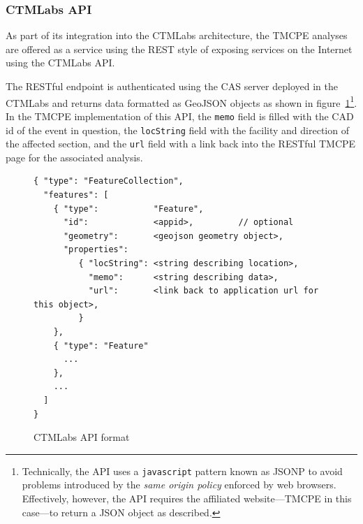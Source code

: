 \documentclass[12pt]{report}
\newcounter{space}
\begin{document}


\subsubsection{CTMLabs API}
\label{sec:ctmlabs-api}

As part of its integration into the \ac{CTMLabs} architecture, the
\ac{TMCPE} analyses are offered as a service using the \ac{REST} style
of exposing services on the Internet
\citep{fielding00:_archit_styles_desig_networ_softw_archit} using the
CTMLabs \ac{API}.

The RESTful endpoint is authenticated using the \ac{CAS} server
deployed in the \ac{CTMLabs} and returns data formatted as
\ac{GeoJSON} objects \citep{butler08:_geojs_format_specif} as shown in
figure~\ref{fig:ctmlabs-api}\footnote{Technically, the \ac{API} uses a
  \texttt{javascript} pattern known as \ac{JSONP}
  \citep{özses09:_cross_jsonp_part} to avoid problems introduced by
  the \emph{same origin policy} enforced by web browsers.
  Effectively, however, the \ac{API} requires the affiliated
  website---\ac{TMCPE} in this case---to return a JSON object as
  described.}.  In the \ac{TMCPE} implementation of this \ac{API}, the
\texttt{memo} field is filled with the CAD id of the event in
question, the \texttt{locString} field with the facility and direction
of the affected section, and the \texttt{url} field with a link back
into the RESTful \ac{TMCPE} page for the associated analysis.
\begin{figure}[t]
  \centering
\begin{singlespace}
\begin{verbatim}
{ "type": "FeatureCollection",
  "features": [
    { "type":           "Feature",
      "id":             <appid>,         // optional
      "geometry":       <geojson geometry object>,
      "properties":    
         { "locString": <string describing location>,
           "memo":      <string describing data>,
           "url":       <link back to application url for this object>,
         }
    },
    { "type": "Feature"
      ...
    },
    ...
  ]
}
\end{verbatim}
\end{singlespace}
\caption{CTMLabs API format}
  \label{fig:ctmlabs-api}
\end{figure}
\end{document}
